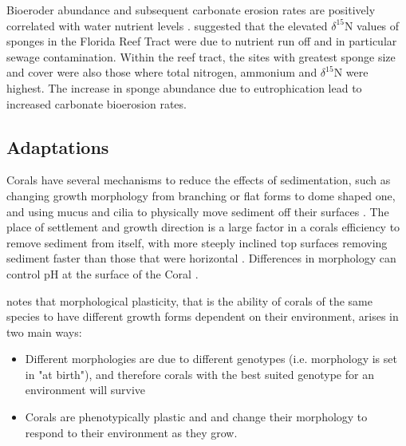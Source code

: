 \documentclass[11pt,a4paper]{article}
\begin{document}
Bioeroder abundance and subsequent carbonate erosion rates are positively correlated with water nutrient levels \citep{Holmes2000}.
 \cite{WardPaige2005Sponge} suggested that the elevated $\delta ^{15}$N values of sponges in the Florida Reef Tract were  due to nutrient run off and in particular sewage contamination. %
 Within the reef tract, the sites with greatest sponge size and cover were also those where total nitrogen, ammonium and  $\delta ^{15}$N were highest.
  The increase in sponge abundance due to eutrophication lead to increased carbonate bioerosion rates.





\subsection{Adaptations}


Corals have several mechanisms to reduce the effects of sedimentation, such as changing growth morphology from branching or flat forms to dome shaped one, and using mucus and cilia to physically move sediment off their surfaces \citep{Logan1988, Stafford1992}.
 The place of settlement and growth direction is a large factor in a corals efficiency to remove sediment from itself, with more steeply inclined top surfaces removing sediment faster than those that were horizontal \citep{Logan1988}.
  Differences in morphology can control pH at the surface of the Coral \citep{Chan2016}.



\cite{Todd2008} notes that morphological plasticity, that is the ability of corals of the same species to have different growth forms dependent on their environment, arises in two main ways:
\begin{itemize}
\item Different morphologies are due to different genotypes (i.e. morphology is set in "at birth"), and therefore corals with the best suited genotype for an environment will survive \citep{Ayre1988}
\item  Corals are phenotypically plastic and and change their morphology to respond to their environment as they grow. \citep{Muko2000}
\end{itemize}
\end{document}
